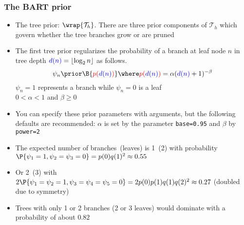 \documentclass[11pt,dvipsnames,usenames,times]{beamer}
\newcommand*{\code}[1]{{\tt #1}}
\begin{document}
\begin{frame}[fragile]
\frametitle{The BART prior}
\begin{itemize}
\item 
The tree prior: $\wrap{\mathcal{T}_h}$.  There are three prior
components of $\mathcal{T}_h$ which govern whether the tree branches
grow or are pruned
\item The first tree prior regularizes the probability of a branch at
  leaf node $n$ in tree depth
  $\textcolor{blue}{d(n)}=\lfloor\log_2 n\rfloor$ as follows.
\begin{align}\label{regularity}
\psi_n \prior 
\B{\textcolor{red}{p(\textcolor{blue}{d(n)})}} 
\where \textcolor{red}{p(\textcolor{blue}{d(n)})}
=\alpha (\textcolor{blue}{d(n)}+1)^{-\beta}
\end{align}
$\psi_n=1$ represents
a branch while $\psi_n=0$ is a leaf\\ 
$0<\alpha<1$ and $\beta\ge 0$ 
\item You
can specify these prior parameters with arguments, but the following
defaults are recommended: $\alpha$ is set by the parameter
\code{base=0.95} and $\beta$ by \code{power=2}
\item The expected number of
branches~(leaves) is 1~(2) with probability
$\P{\psi_{1}=1, \psi_{2}=\psi_{3}=0}=p(0)q(1)^2 \approx 0.55$
\item Or 2~(3) with 
$2\P{\psi_{1}=\psi_{2}=1, \psi_{3}=\psi_{4}=\psi_{5}=0}=
2p(0)p(1)q(1)q(2)^2 \approx 0.27$
(doubled due to symmetry)
\item Trees with only 1 or 2 branches (2 or 3 leaves) would
dominate with a probability of about $0.82$
\end{itemize}
\end{frame}
\end{document}
